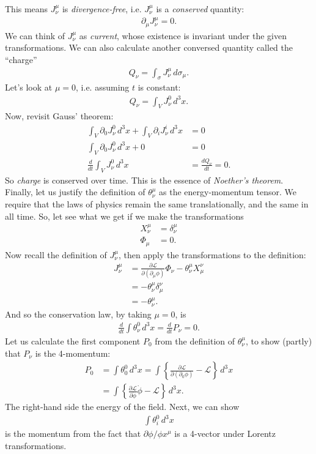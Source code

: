 \documentclass[a4paper,11pt]{article}
\numberwithin{equation}{section}
\theoremstyle{definition}
\newcommand{\p}{\partial}
\newcommand{\lag}{\mathcal{L}}
\begin{document}
This means $J^\mu_\nu$ is \textit{divergence-free}, i.e. $J^\mu_\nu$ is a \textit{conserved} quantity:
\begin{align}
\p_\mu J^\mu_\nu = 0.
\end{align}
We can think of $J^\mu_\nu$ as \textit{current}, whose existence is invariant under the given transformations. We can also calculate another conversed quantity called the ``charge''
\begin{align}
Q_\nu = \int_\sigma J^\mu_\nu\,d\sigma_\mu.
\end{align}
Let's look at $\mu=0$, i.e. assuming $t$ is constant:
\begin{align}
Q_\nu = \int_VJ^0_\nu\,d^3x.
\end{align}
Now, revisit Gauss' theorem:
\begin{align}
\int_V \p_0 J^0_\nu\,d^3x + \int_V \p_iJ^i_\nu\,d^3x&=0\\
\int_V \p_0 J^0_\nu\,d^3x + 0 &= 0\\
\frac{d}{dt}\int_V J^0_\nu\,d^3x &= \frac{dQ_\nu}{dt} = 0.
\end{align}
So \textit{charge} is conserved over time. This is the essence of \textit{Noether's theorem}.\\

Finally, let us justify the definition of $\theta^\mu_\nu$ as the energy-momentum tensor. We require that the laws of physics remain the same translationally, and the same in all time. So, let see what we get if we make the transformations
\begin{align}
X^\mu_\nu &= \delta^\mu_\nu\\
\Phi_\mu &= 0.
\end{align}
Now recall the definition of $J^\mu_\nu$, then apply the transformations to the definition:
\begin{align}
J^\mu_\nu &= \frac{\p\lag}{\p(\p_\mu\phi)}\Phi_\nu - \theta^\mu_\nu X^\nu_\mu\\
& = -\theta^\mu_\nu \delta ^\nu_\mu\\
& = -\theta^\mu_\nu.
\end{align}
And so the conservation law, by taking $\mu=0$, is
\begin{align}
\frac{d}{dt}\int \theta^0_\nu\,d^3x = \frac{d}{dt}P_\nu= 0.
\end{align}
Let us calculate the first component $P_0$ from the definition of $\theta^\mu_\nu$, to show (partly) that $P_\nu$ is the 4-momentum:
\begin{align}
P_0 &= \int\theta^0_0\,d^3x = \int\left\{\frac{\p \lag}{\p(\p_0\phi)} - \lag \right\} \,d^3x\\
& = \int \left\{
\frac{\p\lag}{\p\dot{\phi}}\dot{\phi} - \lag \right\}\,d^3x. 
\end{align}
The right-hand side the energy of the field. Next, we can show
\begin{align}
\int \theta^0_i\,d^3x
\end{align}
is the momentum from the fact that $\p\phi/\phi x^\mu$ is a 4-vector under Lorentz transformations. \\
\end{document}
